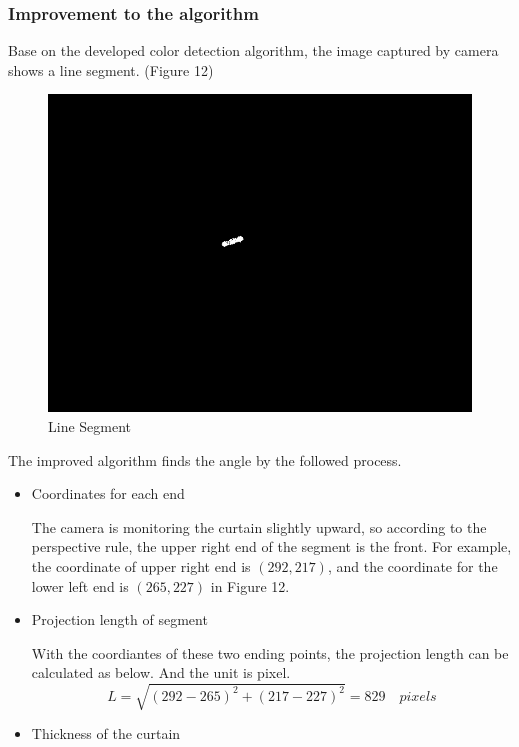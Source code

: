 \documentclass[12pt]{article}
\begin{document}
\begin{flushleft}
\subsubsection{Improvement to the algorithm}
Base on the developed color detection algorithm, the image captured by camera shows a line segment. (Figure 12)
\begin{figure}[ht!]
	\begin{center}
		\includegraphics[scale = 0.6]{segment.png}
		\caption{Line Segment}
	\end{center}
\end{figure}
The improved algorithm finds the angle by the followed process. 
\begin{itemize}
	\item Coordinates for each end
	
	The camera is monitoring the curtain slightly upward, so according to the perspective rule, the upper right end of the segment is the front. For example, the coordinate of upper right end is $(292,217)$, and the coordinate for the lower left end is $(265, 227)$ in Figure 12.
	
	\item Projection length of segment
	
	With the coordiantes of these two ending points, the projection length can be calculated as below. And the unit is pixel. 
	\begin{equation}
	L = \sqrt{(292-265)^2+(217-227)^2} = 829 \quad pixels
	\end{equation}
	
	\item Thickness of the curtain
	

\end{itemize}
\end{flushleft}
\end{document}
